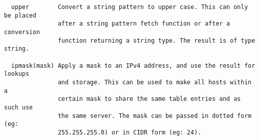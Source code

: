 \begin{verbatim}
  upper        Convert a string pattern to upper case. This can only be placed
               after a string pattern fetch function or after a conversion
               function returning a string type. The result is of type string.

  ipmask(mask) Apply a mask to an IPv4 address, and use the result for lookups
               and storage. This can be used to make all hosts within a
               certain mask to share the same table entries and as such use
               the same server. The mask can be passed in dotted form (eg:
               255.255.255.0) or in CIDR form (eg: 24).


\end{verbatim}
